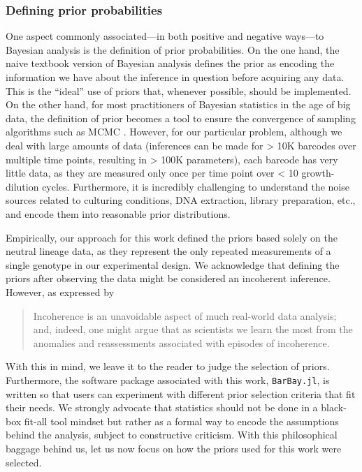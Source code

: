 \documentclass[
  letterpaper,
  DIV=11,
  numbers=noendperiod]{scrartcl}
\begin{document}
\begin{refsegment}
\hypertarget{defining-prior-probabilities}{%
\subsubsection{Defining prior
probabilities}\label{defining-prior-probabilities}}

One aspect commonly associated---in both positive and negative ways---to
Bayesian analysis is the definition of prior probabilities. On the one
hand, the naive textbook version of Bayesian analysis defines the prior
as encoding the information we have about the inference in question
before acquiring any data. This is the ``ideal'' use of priors that,
whenever possible, should be implemented. On the other hand, for most
practitioners of Bayesian statistics in the age of big data, the
definition of prior becomes a tool to ensure the convergence of sampling
algorithms such as MCMC \autocite{gelman2017}. However, for our
particular problem, although we deal with large amounts of data
(inferences can be made for \textgreater{} 10K barcodes over multiple
time points, resulting in \textgreater{} 100K parameters), each barcode
has very little data, as they are measured only once per time point over
\textless{} 10 growth-dilution cycles. Furthermore, it is incredibly
challenging to understand the noise sources related to culturing
conditions, DNA extraction, library preparation, etc., and encode them
into reasonable prior distributions.

Empirically, our approach for this work defined the priors based solely
on the neutral lineage data, as they represent the only repeated
measurements of a single genotype in our experimental design. We
acknowledge that defining the priors after observing the data might be
considered an incoherent inference. However, as expressed by
\textcite{gelman2017}

\begin{quote}
Incoherence is an unavoidable aspect of much real-world data analysis;
and, indeed, one might argue that as scientists we learn the most from
the anomalies and reassessments associated with episodes of incoherence.
\end{quote}

With this in mind, we leave it to the reader to judge the selection of
priors. Furthermore, the software package associated with this work,
\texttt{BarBay.jl}, is written so that users can experiment with
different prior selection criteria that fit their needs. We strongly
advocate that statistics should not be done in a black-box fit-all tool
mindset but rather as a formal way to encode the assumptions behind the
analysis, subject to constructive criticism. With this philosophical
baggage behind us, let us now focus on how the priors used for this work
were selected.


\end{refsegment}
\end{document}
